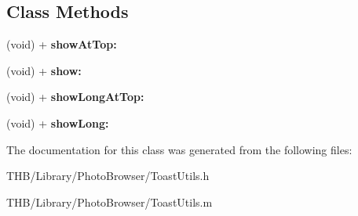 \subsection*{Class Methods}
\begin{DoxyCompactItemize}
\item 
\mbox{\label{interface_toast_utils_a2efd8113612933290a73b8e6bbe22ac2}} 
(void) + {\bfseries show\+At\+Top\+:}
\item 
\mbox{\label{interface_toast_utils_a2fb315451b6bdb845388fb485bd3f40e}} 
(void) + {\bfseries show\+:}
\item 
\mbox{\label{interface_toast_utils_adbc0c2f4a9041911731748a6961b79cd}} 
(void) + {\bfseries show\+Long\+At\+Top\+:}
\item 
\mbox{\label{interface_toast_utils_a5789834a75e1382939abac92d0e0e9bf}} 
(void) + {\bfseries show\+Long\+:}
\end{DoxyCompactItemize}


The documentation for this class was generated from the following files\+:\begin{DoxyCompactItemize}
\item 
T\+H\+B/\+Library/\+Photo\+Browser/Toast\+Utils.\+h\item 
T\+H\+B/\+Library/\+Photo\+Browser/Toast\+Utils.\+m\end{DoxyCompactItemize}
